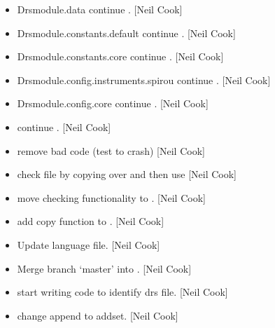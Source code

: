 \documentclass[a4paper,10pt,english]{report}
\begin{document}
\begin{itemize}
\item {} 
Drsmodule.data \sphinxhyphen{} continue . {[}Neil Cook{]}

\item {} 
Drsmodule.constants.default \sphinxhyphen{} continue . {[}Neil Cook{]}

\item {} 
Drsmodule.constants.core \sphinxhyphen{} continue . {[}Neil Cook{]}

\item {} 
Drsmodule.config.instruments.spirou \sphinxhyphen{} continue . {[}Neil Cook{]}

\item {} 
Drsmodule.config.core \sphinxhyphen{} continue . {[}Neil Cook{]}

\item {} 
 \sphinxhyphen{} continue . {[}Neil Cook{]}

\item {} 
 \sphinxhyphen{} remove bad code (test to crash) {[}Neil Cook{]}

\item {} 
 \sphinxhyphen{} check file by copying  over 
and then use  {[}Neil Cook{]}

\item {} 
 \sphinxhyphen{} move checking functionality to . {[}Neil Cook{]}

\item {} 
 \sphinxhyphen{} add copy function to . {[}Neil Cook{]}

\item {} 
Update language file. {[}Neil Cook{]}

\item {} 
Merge branch ‘master’ into . {[}Neil Cook{]}

\item {} 
 \sphinxhyphen{} start writing code to identify drs file. {[}Neil
Cook{]}

\item {} 
 \sphinxhyphen{} change append to addset. {[}Neil Cook{]}


\end{itemize}
\end{document}
